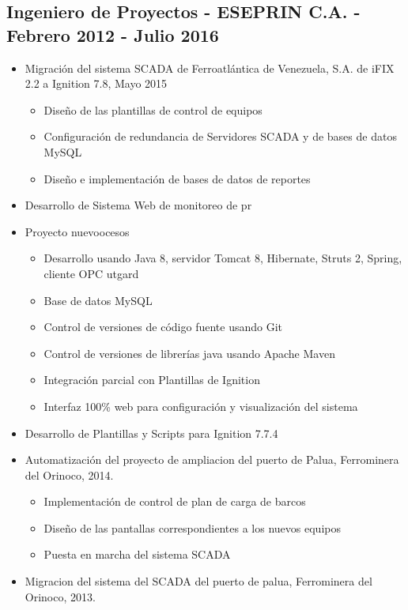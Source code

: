 \documentclass[letterpaper,11pt]{report}
\begin{document}
\subsection*{Ingeniero de Proyectos - ESEPRIN C.A. - Febrero 2012 - Julio 2016}
  \begin{itemize}
    \item Migración del sistema SCADA de Ferroatlántica de Venezuela, S.A. de iFIX 2.2 a Ignition 7.8, Mayo 2015
        \begin{itemize}
            \item Diseño de las plantillas de control de equipos
            \item Configuración de redundancia de Servidores SCADA y de bases de datos MySQL
            \item Diseño e implementación de bases de datos de reportes
        \end{itemize}
    \item Desarrollo de Sistema Web de monitoreo de pr
    \item Proyecto nuevoocesos
        \begin{itemize}
        \item Desarrollo usando Java 8, servidor Tomcat 8, Hibernate, Struts 2, Spring, cliente OPC utgard
        \item Base de datos MySQL
        \item Control de versiones de código fuente usando Git
        \item Control de versiones de librerías java usando Apache Maven
        \item Integración parcial con Plantillas de Ignition
        \item Interfaz 100\% web para configuración y visualización del sistema
        \end{itemize}
    \item Desarrollo de Plantillas y Scripts para Ignition 7.7.4
    \item Automatización del proyecto de ampliacion del puerto de Palua, Ferrominera del Orinoco, 2014.
      \begin{itemize}
        \item Implementación de control de plan de carga de barcos
        \item Diseño de las pantallas correspondientes a los nuevos equipos
        \item Puesta en marcha del sistema SCADA
      \end{itemize}
    \item Migracion del sistema del SCADA del puerto de palua, Ferrominera del Orinoco, 2013.

\end{itemize}
\end{document}
